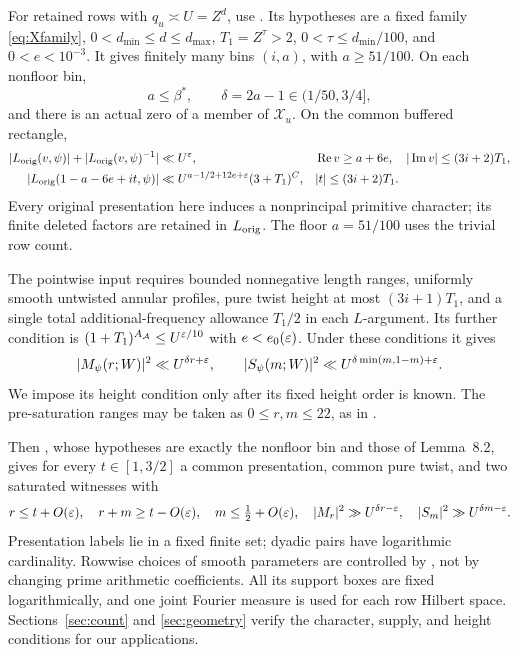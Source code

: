 For retained rows with $q_u\asymp U=Z^d$, use . Its hypotheses are a fixed family \eqref{eq:Xfamily}, $0<d_{\min}\le d\le d_{\max}$, $T_1=Z^\tau>2$, $0<\tau\le d_{\min}/100$, and $0<e<10^{-3}$. It gives finitely many bins $(i,a)$, with $a\ge51/100$. On each nonfloor bin,
\begin{equation}\label{eq:binrange}
 a\le\beta^*,\qquad \delta=2a-1\in(1/50,3/4],
\end{equation}
and there is an actual zero of a member of $\mathcal X_u$. On the common buffered rectangle,
\begin{align}
 |L_{\rm orig}(v,\psi)|+|L_{\rm orig}(v,\psi)^{-1}|&\ll U^\varepsilon,
 &&\operatorname{Re} v\ge a+6e,\quad |\operatorname{Im} v|\le(3i+2)T_1,\label{eq:buffer}\\
 |L_{\rm orig}(1-a-6e+it,\psi)|&\ll U^{a-1/2+12e+\varepsilon}(3+T_1)^C,
 &&|t|\le(3i+2)T_1.\label{eq:reflectedbuffer}
\end{align}
Every original presentation here induces a nonprincipal primitive character; its finite deleted factors are retained in $L_{\rm orig}$. The floor $a=51/100$ uses the trivial row count.

The pointwise input  requires bounded nonnegative length ranges, uniformly smooth untwisted annular profiles, pure twist height at most $(3i+1)T_1$, and a single total additional-frequency allowance $T_1/2$ in each $L$-argument. Its further condition is $(1+T_1)^{A_{\mathcal A}}\le U^{\varepsilon/10}$ with $e<e_0(\varepsilon)$. Under these conditions it gives
\[
 |M_\psi(r;W)|^2\ll U^{\delta r+\varepsilon},\qquad
 |S_\psi(m;W)|^2\ll U^{\delta\min(m,1-m)+\varepsilon}.
\]
We impose its height condition only after its fixed height order is known. The pre-saturation ranges may be taken as $0\le r,m\le22$, as in .

Then , whose hypotheses are exactly the nonfloor bin and those of Lemma~8.2, gives for every $t\in[1,3/2]$ a common presentation, common pure twist, and two saturated witnesses with
\begin{equation}\label{eq:witness}
 r\le t+O(\varepsilon),\quad r+m\ge t-O(\varepsilon),\quad
 m\le\tfrac12+O(\varepsilon),\quad
 |M_r|^2\gg U^{\delta r-\varepsilon},\quad |S_m|^2\gg U^{\delta m-\varepsilon}.
\end{equation}
Presentation labels lie in a fixed finite set; dyadic pairs have logarithmic cardinality. Rowwise choices of smooth parameters are controlled by , not by changing prime arithmetic coefficients. All its support boxes are fixed logarithmically, and one joint Fourier measure is used for each row Hilbert space. Sections~\ref{sec:count} and \ref{sec:geometry} verify the character, supply, and height conditions for our applications.

